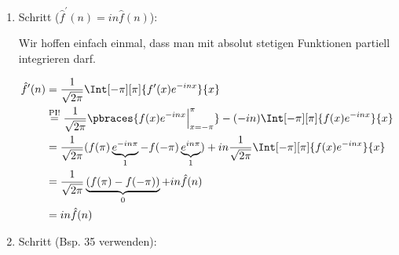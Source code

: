 \begin{solution}

\phantom{}

\begin{enumerate}[label = \arabic*.]

    \item Schritt ($\hat f^\prime(n) = i n \hat f(n)$):
    
    Wir hoffen einfach einmal, dass man mit absolut stetigen Funktionen partiell integrieren darf.

    \begin{align*}
        \hat f^\prime(n)
        & =
        \frac{1}{\sqrt{2 \pi}}
        \Int[-\pi][\pi]
        {
            f^\prime(x)
            e^{-i n x}
        }{x} \\
        & \stackrel
        {
            \mathrm{PI!}
        }{=}
        \frac{1}{\sqrt{2 \pi}}
        \pbraces
        {
            f(x) e^{-i n x} \Big |_{x = -\pi}^\pi
        }
        -
        (-i n)
        \Int[-\pi][\pi]
        {
            f(x)
            e^{-i n x}
        }{x} \\
        & =
        \frac{1}{\sqrt{2 \pi}}
        (
            f(\pi)
            \underbrace{e^{-i n \pi}}_1
            -
            f(-\pi)
            \underbrace{e^{i n \pi}}_1
        )
        +
        i n
        \frac{1}{\sqrt{2 \pi}}
        \Int[-\pi][\pi]
        {
            f(x)
            e^{-i n x}
        }{x} \\
        & =
        \frac{1}{\sqrt{2 \pi}}
        \underbrace
        {
            (
                f(\pi)
                -
                f(-\pi)
            )
        }_0
        +
        i n \hat f(n) \\
        & =
        i n \hat f(n)
    \end{align*}

    \item Schritt (Bsp. 35 verwenden):
    

\end{enumerate}
\end{solution}
